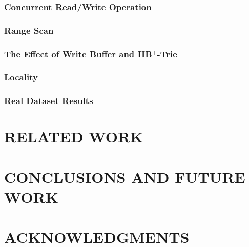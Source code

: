 \documentclass[lang=cn]{cls/elegantpaper}
\begin{document}
\subsubsection{Concurrent Read/Write Operation}

\subsubsection{Range Scan}

\subsubsection{The Effect of Write Buffer and HB$^+$-Trie}

\subsubsection{Locality}

\subsubsection{Real Dataset Results}

\newpage

\section{RELATED WORK}

\newpage

\section{CONCLUSIONS AND FUTURE WORK}

\newpage

\section{ACKNOWLEDGMENTS}

\newpage


\end{document}
